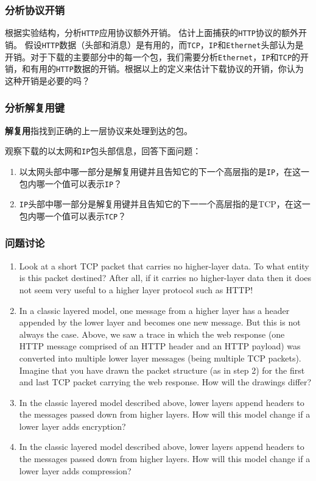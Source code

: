 \documentclass{article}
\begin{document}
\subsubsection{分析协议开销}

根据实验结构，分析\texttt{HTTP}应用协议额外开销。
估计上面捕获的\texttt{HTTP}协议的额外开销。
假设\texttt{HTTP}数据（头部和消息）是有用的，而\texttt{TCP}，\texttt{IP}和\texttt{Ethernet}头部认为是开销。对于下载的主要部分中的每一个包，我们需要分析\texttt{Ethernet}，\texttt{IP}和\texttt{TCP}的开销，和有用的\texttt{HTTP}数据的开销。根据以上的定义来估计下载协议的开销，你认为这种开销是必要的吗？

\subsubsection{分析解复用键}

\textbf{解复用}指找到正确的上一层协议来处理到达的包。

观察下载的以太网和\texttt{IP}包头部信息，回答下面问题：

\begin{enumerate}[noitemsep]
  \item 以太网头部中哪一部分是解复用键并且告知它的下一个高层指的是\texttt{IP}，在这一包内哪一个值可以表示\texttt{IP}？
  \item \texttt{IP}头部中哪一部分是解复用键并且告知它的下一一个高层指的是TCP，在这一包内哪一个值可以表示\texttt{TCP}？
\end{enumerate}

\subsubsection{问题讨论}

\begin{enumerate}[noitemsep]
  \item Look at a short TCP packet that carries no higher-layer data. To what entity is this packet destined? After all, if it carries no higher-layer data then it does not seem very useful to a higher layer protocol such as HTTP!
  \item In a classic layered model, one message from a higher layer has a header appended by the lower layer and becomes one new message. But this is not always the case. Above, we saw a trace in which the web response (one HTTP message comprised of an HTTP header and an HTTP payload) was converted into multiple lower layer messages (being multiple TCP packets).  Imagine that you have drawn the packet structure (as in step 2) for the first and last TCP packet carrying the web response.  How will the drawings differ?
  \item In the classic layered model described above, lower layers append headers to the messages passed down from higher layers. How will this model change if a lower layer adds encryption?
  \item In the classic layered model described above, lower layers append headers to the messages passed down from higher layers. How will this model change if a lower layer adds compression?
\end{enumerate}
\end{document}
